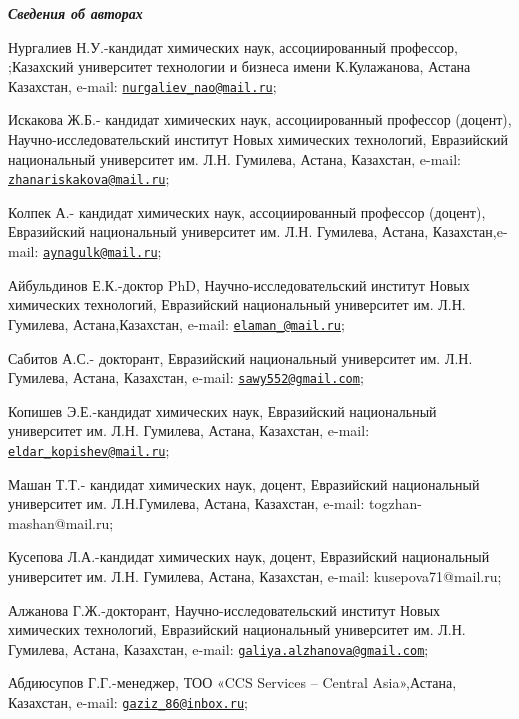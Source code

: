 \begin{authorinfo}
\hspace{1em}\emph{{\bfseries Сведения об авторах}}

Нургалиев Н.У.-кандидат химических наук, ассоциированный профессор,
;Казахский университет технологии и бизнеса имени К.Кулажанова, Астана
Казахстан, e-mail:
\href{mailto:nurgaliev_nao@mail.ru}{\nolinkurl{nurgaliev\_nao@mail.ru}};

Искакова Ж.Б.- кандидат химических наук, ассоциированный профессор
(доцент), Научно-исследовательский институт Новых химических технологий,
Евразийский национальный университет им. Л.Н. Гумилева, Астана,
Казахстан, e-mail:
\href{mailto:zhanariskakova@mail.ru}{\nolinkurl{zhanariskakova@mail.ru}};

Колпек А.- кандидат химических наук, ассоциированный профессор (доцент),
Евразийский национальный университет им. Л.Н. Гумилева, Астана,
Казахстан,e-mail:
\href{mailto:aynagulk@mail.ru}{\nolinkurl{aynagulk@mail.ru}};

Айбульдинов Е.К.-доктор PhD, Научно-исследовательский институт Новых
химических технологий, Евразийский национальный университет им. Л.Н.
Гумилева, Астана,Казахстан, e-mail:
\href{mailto:elaman_@mail.ru}{\nolinkurl{elaman\_@mail.ru}};

Сабитов А.С.- докторант, Евразийский национальный университет им. Л.Н.
Гумилева, Астана, Казахстан, e-mail:
\href{mailto:sawy552@gmail.com}{\nolinkurl{sawy552@gmail.com}};

Копишев Э.Е.-кандидат химических наук, Евразийский национальный
университет им. Л.Н. Гумилева, Астана, Казахстан, e-mail:
\href{mailto:eldar_kopishev@mail.ru}{\nolinkurl{eldar\_kopishev@mail.ru}};

Машан Т.Т.- кандидат химических наук, доцент, Евразийский национальный
университет им. Л.Н.Гумилева, Астана, Казахстан, e-mail:
togzhan-mashan@mail.ru;

Кусепова Л.А.-кандидат химических наук, доцент, Евразийский национальный
университет им. Л.Н. Гумилева, Астана, Казахстан, e-mail:
kusepova71@mail.ru;

Алжанова Г.Ж.-докторант, Научно-исследовательский институт Новых
химических технологий, Евразийский национальный университет им. Л.Н.
Гумилева, Астана, Казахстан, e-mail:
\href{mailto:galiya.alzhanova@gmail.com}{\nolinkurl{galiya.alzhanova@gmail.com}};

Абдиюсупов Г.Г.-менеджер, ТОО «CCS Services -- Central Asia»,Астана,
Казахстан, e-mail:
\href{mailto:gaziz_86@inbox.ru}{\nolinkurl{gaziz\_86@inbox.ru}};


\end{authorinfo}
